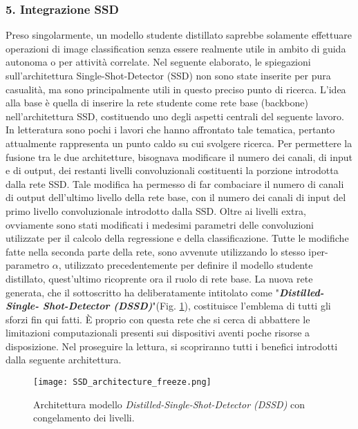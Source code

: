 \subsubsection{5. Integrazione SSD}
Preso singolarmente, un modello studente distillato saprebbe solamente 
effettuare operazioni di image classification senza essere realmente utile in 
ambito di guida autonoma o per attività correlate. Nel seguente elaborato, 
le spiegazioni sull'architettura Single-Shot-Detector (SSD) non sono state 
inserite per pura casualità, ma sono principalmente utili in questo preciso 
punto di ricerca. L'idea alla base è quella di inserire la rete studente come 
rete base (backbone) nell'architettura SSD, costituendo uno degli aspetti 
centrali del seguente lavoro. In letteratura sono pochi i lavori che hanno 
affrontato tale tematica, pertanto attualmente rappresenta un punto caldo 
su cui svolgere ricerca. Per permettere la fusione tra le due architetture, 
bisognava modificare il numero dei canali, di input e di output, dei restanti 
livelli convoluzionali costituenti la porzione introdotta dalla rete SSD. Tale 
modifica ha permesso di far combaciare il numero di canali di output 
dell'ultimo livello della rete base, con il numero dei canali di input del primo 
livello convoluzionale introdotto dalla SSD. Oltre ai livelli extra, ovviamente 
sono stati modificati i medesimi parametri delle convoluzioni utilizzate per il 
calcolo della regressione e della classificazione. Tutte le modifiche fatte nella 
seconda parte della rete, sono avvenute utilizzando lo stesso iper-parametro 
$\alpha$, utilizzato precedentemente per definire il modello studente distillato, 
quest'ultimo ricoprente ora il ruolo di rete base. La nuova rete generata, 
che il sottoscritto ha deliberatamente intitolato come "{\bfseries{\emph{Distilled-Single-
Shot-Detector (DSSD)}}}"(Fig. \ref{DSSD_archs}), costituisce l'emblema di tutti gli sforzi fin qui 
fatti. È proprio con questa rete che si cerca di abbattere le limitazioni 
computazionali presenti sui dispositivi aventi poche risorse a disposizione. 
Nel proseguire la lettura, si scopriranno tutti i benefici introdotti dalla 
seguente architettura.
\begin{figure}
    \centering
    \texttt{[image: SSD\_architecture\_freeze.png]}
    \centering
    \caption{Architettura modello \emph{Distilled-Single-Shot-Detector (DSSD)} con congelamento dei livelli.}
    \label{DSSD_archs}
\end{figure}


